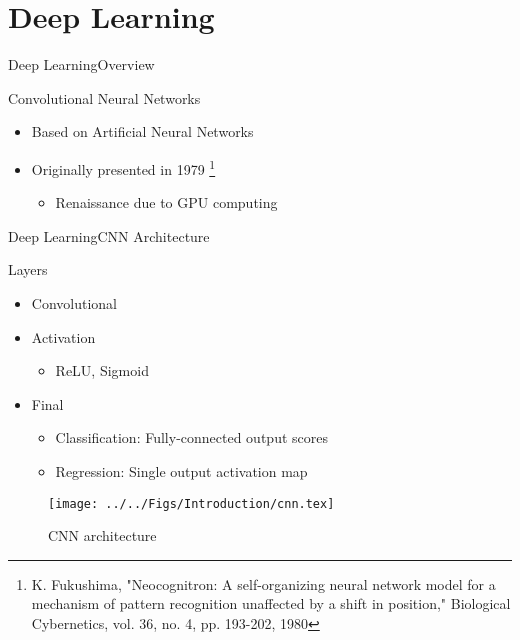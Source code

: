 \section{Deep Learning}
\begin{frame}{Deep Learning}{Overview}
    \begin{block}{Convolutional Neural Networks}
        \begin{itemize}
            \item Based on Artificial Neural Networks
            \item Originally presented in 1979 \footnote{K. Fukushima, "Neocognitron: A self-organizing neural network model for a mechanism of pattern recognition unaffected by a shift in position," Biological Cybernetics, vol. 36, no. 4, pp. 193-202, 1980}
                \begin{itemize}
                    \item Renaissance due to GPU computing
                \end{itemize}
        \end{itemize}
    \end{block}
\end{frame}

\begin{frame}{Deep Learning}{CNN Architecture}
    \begin{block}{Layers}
        \begin{itemize}
            \item Convolutional
            \item Activation
                \begin{itemize}
                    \item ReLU, Sigmoid
                \end{itemize}
            \item Final
                \begin{itemize}
                    \item Classification: Fully-connected output scores
                    \item Regression: Single output activation map
                \end{itemize}
        \end{itemize}
        \begin{figure}
            \texttt{[image: ../../Figs/Introduction/cnn.tex]}
            \caption*{\scriptsize CNN architecture}
        \end{figure}
    \end{block}
\end{frame}

